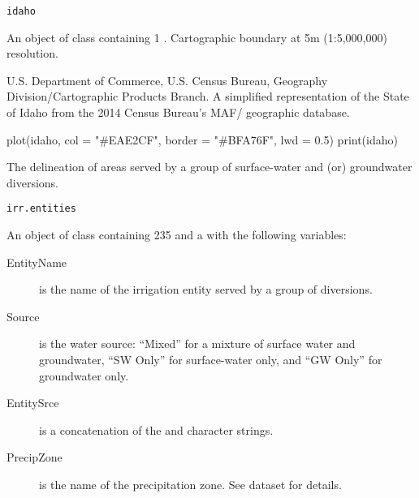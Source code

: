 \documentclass[a4paper]{book}
\begin{document}
%
\begin{Usage}
\begin{verbatim}
idaho
\end{verbatim}
\end{Usage}
%
\begin{Format}
An object of  class containing 1 .
Cartographic boundary at 5m (1:5,000,000) resolution.
\end{Format}
%
\begin{Source}\relax
U.S. Department of Commerce, U.S. Census Bureau, Geography Division/Cartographic Products Branch.
A simplified representation of the State of Idaho from the 2014 Census Bureau's MAF/ geographic database.
\end{Source}
%
\begin{Examples}
\begin{ExampleCode}
plot(idaho, col = "#EAE2CF", border = "#BFA76F", lwd = 0.5)
print(idaho)
\end{ExampleCode}
\end{Examples}
%
\begin{Description}\relax
The delineation of areas served by a group of surface-water and (or) groundwater diversions.
\end{Description}
%
\begin{Usage}
\begin{verbatim}
irr.entities
\end{verbatim}
\end{Usage}
%
\begin{Format}
An object of  class containing 235  and a  with the following variables:
\begin{description}

\item[EntityName] is the name of the irrigation entity served by a group of diversions.
\item[Source] is the water source: ``Mixed'' for a mixture of surface water and groundwater, ``SW Only'' for surface-water only, and ``GW Only'' for groundwater only.
\item[EntitySrce] is a concatenation of the  and  character strings.
\item[PrecipZone] is the name of the precipitation zone.
See  dataset for details.

\end{description}

\end{Format}
\end{document}
